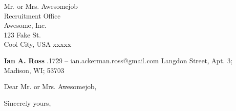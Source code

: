 \documentclass[11pt]{letter} %
\def\recip{Mr. or Mrs. Awesomejob}
\def\recipaddr{Recruitment Office\\
    Awesome, Inc.\\
    123 Fake St.\\
Cool City, USA xxxxx}
\begin{document}

\begin{letter}{\recip\\
\recipaddr}


\begin{center}
    {\Large\bf Ian A. Ross} %
    \smallskip{}.1729 -- ian.ackerman.ross@gmail.com
    \smallskip{} Langdon Street, Apt. 3; Madison, WI; 53703
\end{center} 

\signature{Ian Ross} %



\opening{Dear \recip,} 
 
\lipsum[1]

\lipsum[17]
 
\lipsum[137]

\closing{Sincerely yours,}




\end{letter}
\end{document}
